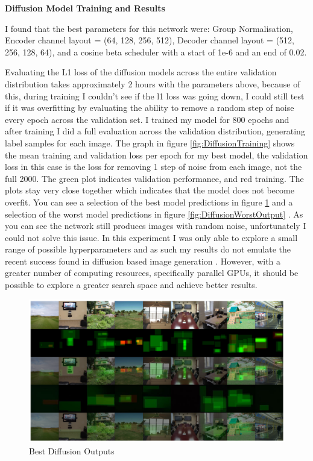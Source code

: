 \documentclass{UoYCSproject}
\begin{document}
\textbf{Diffusion Model Training and Results}

I found that the best parameters for this network were: Group Normalisation, Encoder channel layout = (64, 128, 256, 512), Decoder channel layout = (512, 256, 128, 64), and a cosine beta scheduler with a start of 1e-6 and an end of 0.02.

Evaluating the L1 loss of the diffusion models across the entire validation distribution takes approximately 2 hours with the parameters above, because of this, during training I couldn't see if the l1 loss was going down, I could still test if it was overfitting by evaluating the ability to remove a random step of noise every epoch across the validation set. I trained my model for 800 epochs and after training I did a full evaluation across the validation distribution, generating label samples for each image. The graph in figure 
\ref{fig:DiffusionTraining}
shows the mean training and validation loss per epoch for my best model, the validation loss in this case is the loss for removing 1 step of noise from each image, not the full 2000. The green plot indicates validation performance, and red training. The plots stay very close together which indicates that the model does not become overfit.
You can see a selection of the best model predictions in figure 
\ref{fig:DiffusionBestOutputs}
and a selection of the worst model predictions in figure 
\ref{fig:DiffusionWorstOutput}
. As you can see the network still produces images with random noise, unfortunately I could not solve this issue. In this experiment I was only able to explore a small range of possible hyperparameters and as such my results do not emulate the recent success found in diffusion based image generation \cite{ramesh2022hierarchical, saharia2022photorealistic}. However, with a greater number of computing resources, specifically parallel GPUs, it should be possible to explore a greater search space and achieve better results.

\begin{figure}[ht]
    \centering
    \includegraphics[width=\linewidth]{Diffusion Best Outputs}
    \caption{Best Diffusion Outputs}
    \label{fig:DiffusionBestOutputs}
\end{figure}
\end{document}

